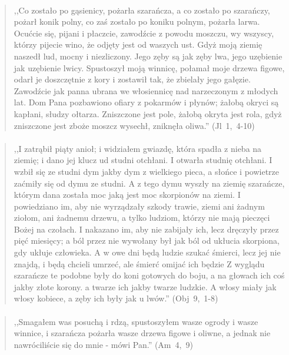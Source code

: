 \documentclass[10pt,a4paper,oneside]{article}
\begin{document}
\paragraph{}
\begin{quote}
,,Co zostało po gąsienicy, pożarła szarańcza, a co zostało po szarańczy, pożarł konik polny, co zaś zostało po koniku polnym, pożarła larwa. Ocućcie się, pijani i płaczcie, zawodźcie z powodu moszczu, wy wszyscy, którzy pijecie wino, że odjęty jest od waszych ust. Gdyż moją ziemię naszedł lud, mocny i niezliczony. Jego zęby są jak zęby lwa, jego uzębienie jak uzębienie lwicy. Spustoszył moją winnicę, połamał moje drzewa figowe, odarł je doszczętnie z kory i zostawił tak, że zbielały jego gałęzie. Zawodźcie jak panna ubrana we włosiennicę nad narzeczonym z młodych lat. Dom Pana pozbawiono ofiary z pokarmów i płynów; żałobą okryci są kapłani, słudzy ołtarza. Zniszczone jest pole, żałobą okryta jest rola, gdyż zniszczone jest zboże moszcz wysechł, zniknęła oliwa.'' \mbox{(Jl 1, 4-10)}
\end{quote}
\paragraph{}
\begin{quote}
,,I zatrąbił piąty anioł; i widziałem gwiazdę, która spadła z nieba na ziemię; i dano jej klucz ud studni otchłani. I otwarła studnię otchłani. I wzbił się ze studni dym jakby dym z wielkiego pieca, a słońce i powietrze zaćmiły się od dymu ze studni. A z tego dymu wyszły na ziemię szarańcze, którym dana została moc jaką jest moc skorpionów na ziemi. I powiedziano im, aby nie wyrządzały szkody trawie, ziemi ani żadnym ziołom, ani żadnemu drzewu, a tylko ludziom, którzy nie mają pieczęci Bożej na czołach. I nakazano im, aby nie zabijały ich, lecz dręczyły przez pięć miesięcy; a ból przez nie wywołany był jak ból od ukłucia skorpiona, gdy ukłuje człowieka. A w owe dni będą ludzie szukać śmierci, lecz jej nie znajdą, i będą chcieli umrzeć, ale śmierć omijać ich będzie Z wyglądu szarańcze te podobne były do koni gotowych do boju, a na głowach ich coś jakby złote korony. a twarze ich jakby twarze ludzkie. A włosy miały jak włosy kobiece, a zęby ich były jak u lwów.'' \mbox{(Obj 9, 1-8)}
\end{quote}
\paragraph{}
\begin{quote}
,,Smagałem was posuchą i rdzą, spustoszyłem wasze ogrody i wasze winnice, i szarańcza pożarła wasze drzewa figowe i oliwne, a jednak nie nawróciliście się do mnie - mówi Pan.'' \mbox{(Am 4, 9)}
\end{quote}
\end{document}
